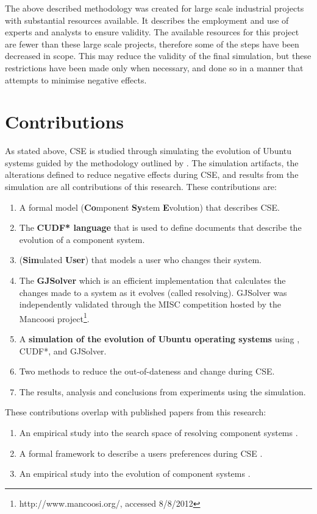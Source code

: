 The above described methodology was created for large scale industrial projects with substantial resources available.
It describes the employment and use of experts and analysts to ensure validity.
The available resources for this project are fewer than these large scale projects, therefore some of the steps have been decreased in scope.
This may reduce the validity of the final simulation, but these restrictions have been made only when necessary,
and done so in a manner that attempts to minimise negative effects.

\section{Contributions}
As stated above, CSE is studied through simulating the evolution of Ubuntu systems guided by the methodology outlined by \cite{Law2005}.
The simulation artifacts, the alterations defined to reduce negative effects during CSE, 
and results from the simulation are all contributions of this research. 
These contributions are:
\begin{enumerate}
  \item A formal model \textbf{\modelname} (\textbf{Co}mponent \textbf{Sy}stem \textbf{E}volution) that describes CSE. 
  \item The \textbf{CUDF* language} that is used to define documents that describe the evolution of a component system.
  \item \textbf{\usermodel} (\textbf{Sim}ulated \textbf{User}) that models a user who changes their system.
  \item The \textbf{GJSolver} which is an efficient implementation that calculates the changes made to a system as it evolves (called resolving).
	GJSolver was independently validated through the MISC competition hosted by the Mancoosi project\footnote{http://www.mancoosi.org/, accessed 8/8/2012}. 
  \item A \textbf{simulation of the evolution of Ubuntu operating systems} using \modelname, CUDF*, \usermodel and GJSolver.
  \item Two methods to reduce the out-of-dateness and change during CSE. 
  \item The results, analysis and conclusions from experiments using the simulation.
\end{enumerate}

These contributions overlap with published papers from this research:
\begin{enumerate}
  \item An empirical study into the search space of resolving component systems \citep{Jenson2010}.
  \item A formal framework to describe a users preferences during CSE \citep{Jenson2010a}.
  \item An empirical study into the evolution of component systems \citep{jenson2011}.
\end{enumerate}

